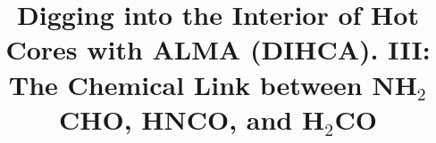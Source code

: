 \documentclass[twocolumn, twocolappendix]{aastex631}
\begin{document}
\title{Digging into the Interior of Hot Cores with ALMA (DIHCA). III: \\The Chemical Link between NH$_{2}$CHO, HNCO, and H$_{2}$CO}


\end{document}
